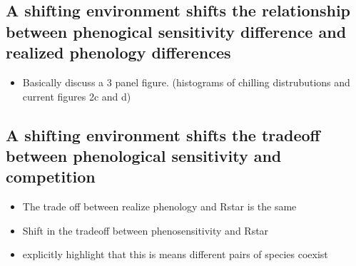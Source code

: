 \documentclass{article}[12pt]
\begin{document}
\subsection{A shifting environment shifts the relationship between phenogical sensitivity difference and realized phenology differences}
\begin{itemize}
\item Basically discuss a 3 panel figure. (histograms of chilling distrubutions and current figures 2c and d)
\end{itemize}

\subsection{A shifting environment shifts the tradeoff between phenological sensitivity and competition}
\begin{itemize}
\item The trade off between realize phenology and Rstar is the same
\item Shift in the tradeoff between phenosensitivity and Rstar
\item explicitly highlight that this is means different pairs of species coexist
\end{itemize}






\end{document}
